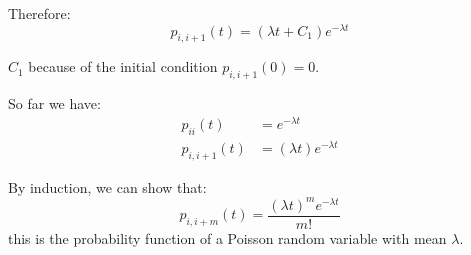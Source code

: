 \documentclass[english,12pt]{article}
\theoremstyle{plain}
\theoremstyle{definition}
\theoremstyle{definition} %
\begin{document}
{Therefore:
\[p_{i,i+1}(t)=(\lambda t+C_1)e^{-\lambda t}\]

$C_1$ because of the initial condition $p_{i,i+1}(0)=0$.

So far we have:
\begin{align*}
p_{ii}(t)&=e^{-\lambda t}\\
p_{i,i+1}(t)&=(\lambda t)e^{-\lambda t}
\end{align*}

By induction, we can show that:
\[p_{i,i+m}(t)=\frac{(\lambda t)^me^{-\lambda t}}{m!}\]
this is the probability function of a Poisson random variable with mean $\lambda$.
}
\end{document}
